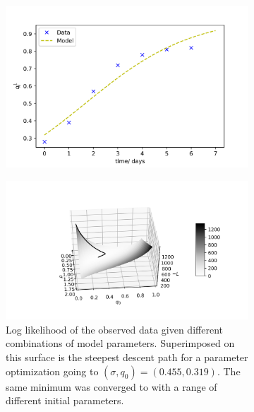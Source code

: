 \documentclass{article}
\begin{document}
\begin{figure}[h]
	\centering
	\begin{subfigure}[t]{0.40\linewidth}
		\centering
		\includegraphics[width = 1.0\linewidth, trim={0 0 0 0}, clip=true]{fit_model.png}
		\label{fig:fitted}	
	\end{subfigure}%
	\hspace{0.05\linewidth}
	\begin{subfigure}[t]{0.50\linewidth}
		\centering
		\includegraphics[width = 1.0\linewidth, trim={90 40 60 60}, clip=true]{Lsurfproj.png}
		\caption{Log likelihood of the observed data given different combinations of model parameters. Superimposed on this surface is the steepest descent path for a parameter optimization going to $(\sigma, q_0) = (0.455, 0.319)$. The same minimum was converged to with a range of different initial parameters.}
		\label{fig:Lsurfdesc}
	\end{subfigure}
\caption{}
\end{figure}
\end{document}
